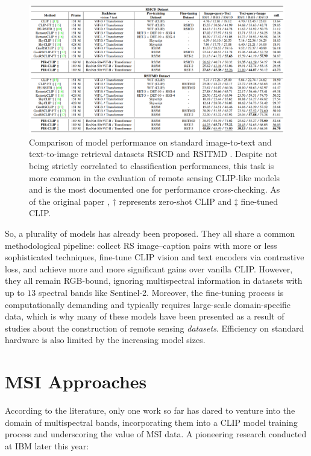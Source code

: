 \documentclass[a4paper, twoside, english]{sapthesis} %
\begin{document}
\begin{figure}[h]
    \centering
    \includegraphics[width=\textwidth]{img/PIRCLIP_summary_results.png}
    \caption{\normalsize Comparison of model performance on standard image-to-text and text-to-image retrieval datasets RSICD \cite{lu2017exploring} and RSITMD \cite{yuan2022exploring}. Despite not being strictly correlated to classification performances, this task is more common in the evaluation of remote sensing CLIP-like models and is the most documented one for performance cross-checking. As of the original paper \cite{pan2024pir}, $\dagger$ represents zero-shot CLIP and $\ddagger$ fine-tuned CLIP.}
    \label{fig:pirclip}
\end{figure}


So, a plurality of models has already been proposed. They all share a common methodological pipeline: collect RS image–caption pairs with more or less sophisticated techniques, fine-tune CLIP vision and text encoders via contrastive loss, and achieve more and more significant gains over vanilla CLIP. However, they all remain RGB-bound, ignoring multispectral information in datasets with up to $13$ spectral bands like Sentinel‑2. Moreover, the fine-tuning process is computationally demanding and typically requires large-scale domain-specific data, which is why many of these models have been presented as a result of studies about the construction of remote sensing \emph{datasets}. Efficiency on standard hardware is also limited by the increasing model sizes.


\section{MSI Approaches}

According to the literature, only one work so far has dared to venture into the domain of multispectral bands, incorporating them into a CLIP model training process and underscoring the value of MSI data. A pioneering research conducted at IBM later this year: 
\end{document}
